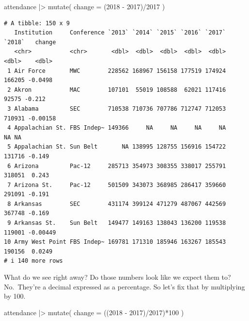 \documentclass[
  letterpaper,
  DIV=11,
  numbers=noendperiod]{scrreprt}
\newenvironment{Shaded}{\begin{snugshade}}{\end{snugshade}}
\newcommand{\AttributeTok}[1]{\textcolor[rgb]{0.40,0.45,0.13}{#1}}
\newcommand{\DecValTok}[1]{\textcolor[rgb]{0.68,0.00,0.00}{#1}}
\newcommand{\FunctionTok}[1]{\textcolor[rgb]{0.28,0.35,0.67}{#1}}
\newcommand{\NormalTok}[1]{\textcolor[rgb]{0.00,0.23,0.31}{#1}}
\newcommand{\SpecialCharTok}[1]{\textcolor[rgb]{0.37,0.37,0.37}{#1}}
\newcommand{\StringTok}[1]{\textcolor[rgb]{0.13,0.47,0.30}{#1}}
\begin{document}
\begin{Shaded}
\begin{Highlighting}[]
\NormalTok{attendance }\SpecialCharTok{|\textgreater{}} \FunctionTok{mutate}\NormalTok{(}
  \AttributeTok{change =}\NormalTok{ (}\StringTok{\textasciigrave{}}\AttributeTok{2018}\StringTok{\textasciigrave{}} \SpecialCharTok{{-}} \StringTok{\textasciigrave{}}\AttributeTok{2017}\StringTok{\textasciigrave{}}\NormalTok{)}\SpecialCharTok{/}\StringTok{\textasciigrave{}}\AttributeTok{2017}\StringTok{\textasciigrave{}}
\NormalTok{) }
\end{Highlighting}
\end{Shaded}

\begin{verbatim}
# A tibble: 150 x 9
   Institution     Conference `2013` `2014` `2015` `2016` `2017` `2018`   change
   <chr>           <chr>       <dbl>  <dbl>  <dbl>  <dbl>  <dbl>  <dbl>    <dbl>
 1 Air Force       MWC        228562 168967 156158 177519 174924 166205 -0.0498 
 2 Akron           MAC        107101  55019 108588  62021 117416  92575 -0.212  
 3 Alabama         SEC        710538 710736 707786 712747 712053 710931 -0.00158
 4 Appalachian St. FBS Indep~ 149366     NA     NA     NA     NA     NA NA      
 5 Appalachian St. Sun Belt       NA 138995 128755 156916 154722 131716 -0.149  
 6 Arizona         Pac-12     285713 354973 308355 338017 255791 318051  0.243  
 7 Arizona St.     Pac-12     501509 343073 368985 286417 359660 291091 -0.191  
 8 Arkansas        SEC        431174 399124 471279 487067 442569 367748 -0.169  
 9 Arkansas St.    Sun Belt   149477 149163 138043 136200 119538 119001 -0.00449
10 Army West Point FBS Indep~ 169781 171310 185946 163267 185543 190156  0.0249 
# i 140 more rows
\end{verbatim}

What do we see right away? Do those numbers look like we expect them to?
No.~They're a decimal expressed as a percentage. So let's fix that by
multiplying by 100.

\begin{Shaded}
\begin{Highlighting}[]
\NormalTok{attendance }\SpecialCharTok{|\textgreater{}} \FunctionTok{mutate}\NormalTok{(}
  \AttributeTok{change =}\NormalTok{ ((}\StringTok{\textasciigrave{}}\AttributeTok{2018}\StringTok{\textasciigrave{}} \SpecialCharTok{{-}} \StringTok{\textasciigrave{}}\AttributeTok{2017}\StringTok{\textasciigrave{}}\NormalTok{)}\SpecialCharTok{/}\StringTok{\textasciigrave{}}\AttributeTok{2017}\StringTok{\textasciigrave{}}\NormalTok{)}\SpecialCharTok{*}\DecValTok{100}
\NormalTok{) }
\end{Highlighting}
\end{Shaded}
\end{document}
